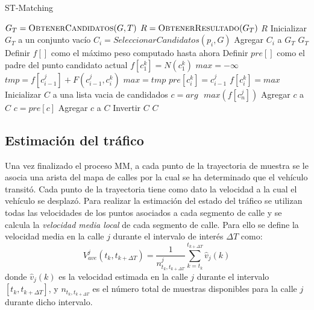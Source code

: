 \begin{algorithm}
\caption{ST-Matching}
\label{alg:st_matching}
\begin{algorithmic}[1]
	\State $G_T = \Call{ObtenerCandidatos}{G,T}$
	\State $R = \Call{ObtenerResultado}{G_T}$
	\State \Return $R$
\EndProcedure
\Statex
{}
	\State Inicializar $G_T$ a un conjunto vacío
		\State $C_i = SeleccionarCandidatos(p_i, G)$
		\State Agregar $C_i$ a $G_T$
	\EndFor
	\State \Return $G_T$
\EndFunction
\Statex
{}
	\State Definir $f[]$ como el máximo peso computado hasta ahora
	\State Definir $pre[]$ como el padre del punto candidato actual
		\State $f[c_1^k] = N(c_1^k)$
	\EndFor
			\State $max = -\infty$
				\State $tmp = f[c_{i-1}^j] + F(c_{i-1}^j,c_i^k)$
					\State $max = tmp$
					\State $pre[c_i^k] = c_{i-1}^j$
				\EndIf
				\State $f[c_i^k] = max$
			\EndFor
		\EndFor
	\EndFor
	\State Inicializar $C$ a una lista vacia de candidados
	\State $c = arg \text{ } max(f[c_n^j])$
		\State Agregar $c$ a $C$
		\State $c = pre[c]$
	\EndFor
	\State Agregar $c$ a $C$
	\State Invertir $C$
	\State \Return $C$
\EndFunction
\end{algorithmic}
\end{algorithm}

\subsection{Estimación del tráfico}
\label{estimacion_trafico}

Una vez finalizado el proceso MM, a cada punto de la trayectoria de muestra se le asocia una arista del mapa de calles por la cual se ha determinado que el vehículo transitó. Cada punto de la trayectoria tiene como dato la velocidad a la cual el vehículo se desplazó. Para realizar la estimación del estado del tráfico se utilizan todas las velocidades de los puntos asociados a cada segmento de calle y se calcula la \emph{velocidad media local} de cada segmento de calle. Para ello se define la velocidad media en la calle $j$ durante el intervalo de interés $\Delta T$ como:
\begin{equation}
\label{eq:velocidad_media}
{ V }_{ ave }^{ j }({ t }_{ k },{ t }_{ k+\Delta T })=\frac { 1 }{ { n }_{ { t }_{ k },{ t }_{ k+\Delta T } }^{ j } } \sum_{ k={ t }_{ k } }^{ { t }_{ k+\Delta T } }{ \hat { { v } } _{ j }(k) }
\end{equation}
donde ${ \hat { { v } } _{ j }(k) }$ es la velocidad estimada en la calle $j$ durante el intervalo $\left[ { t }_{ k },{ t }_{ k+\Delta T } \right] $, y ${ { n }_{ { t }_{ k },{ t }_{ k+\Delta T }}}$ es el número total de muestras disponibles para la calle $j$ durante dicho intervalo.

